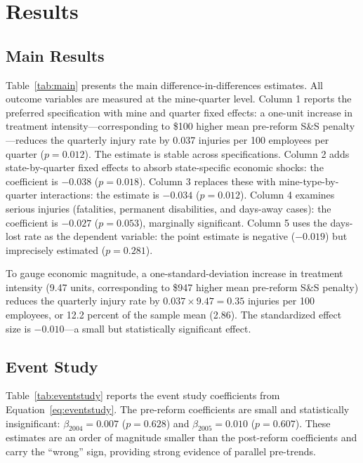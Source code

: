 \documentclass[12pt]{article}
\begin{document}
\section{Results}

\subsection{Main Results}



Table~\ref{tab:main} presents the main difference-in-differences estimates. All outcome variables are measured at the mine-quarter level. Column 1 reports the preferred specification with mine and quarter fixed effects: a one-unit increase in treatment intensity---corresponding to \$100 higher mean pre-reform S\&S penalty---reduces the quarterly injury rate by 0.037 injuries per 100 employees per quarter ($p = 0.012$). The estimate is stable across specifications. Column 2 adds state-by-quarter fixed effects to absorb state-specific economic shocks: the coefficient is $-0.038$ ($p = 0.018$). Column 3 replaces these with mine-type-by-quarter interactions: the estimate is $-0.034$ ($p = 0.012$). Column 4 examines serious injuries (fatalities, permanent disabilities, and days-away cases): the coefficient is $-0.027$ ($p = 0.053$), marginally significant. Column 5 uses the days-lost rate as the dependent variable: the point estimate is negative ($-0.019$) but imprecisely estimated ($p = 0.281$).

To gauge economic magnitude, a one-standard-deviation increase in treatment intensity (9.47 units, corresponding to \$947 higher mean pre-reform S\&S penalty) reduces the quarterly injury rate by $0.037 \times 9.47 = 0.35$ injuries per 100 employees, or 12.2 percent of the sample mean (2.86). The standardized effect size is $-0.010$---a small but statistically significant effect.

\subsection{Event Study}



Table~\ref{tab:eventstudy} reports the event study coefficients from Equation~\ref{eq:eventstudy}. The pre-reform coefficients are small and statistically insignificant: $\beta_{2004} = 0.007$ ($p = 0.628$) and $\beta_{2005} = 0.010$ ($p = 0.607$). These estimates are an order of magnitude smaller than the post-reform coefficients and carry the ``wrong'' sign, providing strong evidence of parallel pre-trends.
\end{document}

